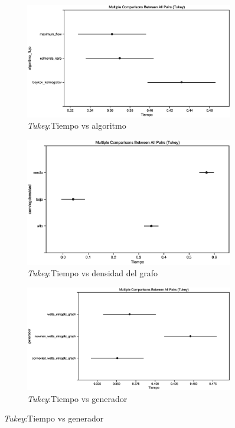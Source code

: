 \documentclass{article}
\begin{document}
\begin{figure}[h]

\begin{subfigure}{0.5\textwidth}
\includegraphics[width=0.9\linewidth]{Imagenes/tablatukeyalgoritmoflujo.eps} 
\caption{\textit{Tukey}:Tiempo vs algoritmo}
\end{subfigure}

\begin{subfigure}{0.5\textwidth}
\includegraphics[width=0.9\linewidth]{Imagenes/tablatukeyconvlogdensidad.eps}
\caption{\textit{Tukey}:Tiempo vs densidad del grafo}
\end{subfigure}

\begin{subfigure}{0.5\textwidth}
\includegraphics[width=0.9\linewidth]{Imagenes/tablatukeygenerador.eps}
\caption{\textit{Tukey}:Tiempo vs generador}
\end{subfigure}


\end{figure}
\end{document}
